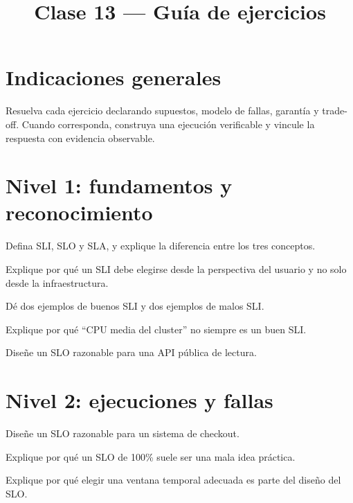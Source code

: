 \documentclass[variant=guia,cover=institutional,mode=screen]{ua-engineering-v6-article}
\title{Clase 13 --- Guía de ejercicios}
\author{\UAProfessor}
\date{\UADate}
\begin{document}
\section{Indicaciones generales}
Resuelva cada ejercicio declarando supuestos, modelo de fallas, garantía y trade-off. Cuando corresponda, construya una ejecución verificable y vincule la respuesta con evidencia observable.

\section{Nivel 1: fundamentos y reconocimiento}
\begin{uaexercise}
Defina SLI, SLO y SLA, y explique la diferencia entre los tres conceptos.
\end{uaexercise}

\begin{uaexercise}
Explique por qué un SLI debe elegirse desde la perspectiva del usuario y no solo desde la infraestructura.
\end{uaexercise}

\begin{uaexercise}
Dé dos ejemplos de buenos SLI y dos ejemplos de malos SLI.
\end{uaexercise}

\begin{uaexercise}
Explique por qué “CPU media del cluster” no siempre es un buen SLI.
\end{uaexercise}

\begin{uaexercise}
Diseñe un SLO razonable para una API pública de lectura.
\end{uaexercise}


\section{Nivel 2: ejecuciones y fallas}
\begin{uaexercise}
Diseñe un SLO razonable para un sistema de checkout.
\end{uaexercise}

\begin{uaexercise}
Explique por qué un SLO de 100\% suele ser una mala idea práctica.
\end{uaexercise}

\begin{uaexercise}
Explique por qué elegir una ventana temporal adecuada es parte del diseño del SLO.
\end{uaexercise}
\end{document}
